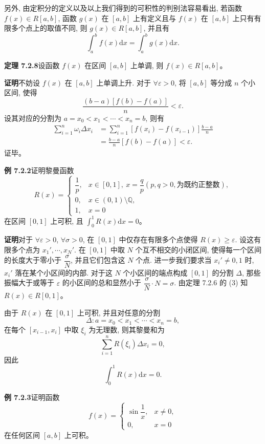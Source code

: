 \documentclass[UTF8,12pt,a4paper,fontset=fandol]{ctexart}
\begin{document}
另外, 由定积分的定义以及以上我们得到的可积性的判别法容易看出, 若函数 $f(x)\in R[a,b]$, 函数 $g(x)$ 在 $[a,b]$ 上有定义且与 $f(x)$ 在 $[a,b]$ 上只有有限多个点上的取值不同, 则 $g(x)\in R[a,b]$, 并且有
\[
  \int_a^b f(x)\mathrm dx=\int_a^b g(x)\mathrm dx.
\]

\noindent\textbf{定理 7.2.8}\quad 设函数 $f(x)$ 在区间 $[a,b]$ 上单调, 则 $f(x)\in R[a,b]$。

\noindent\textbf{证明}\quad 不妨设 $f(x)$ 在 $[a,b]$ 上单调上升. 对于 $\forall\varepsilon>0$, 将 $[a,b]$ 等分成 $n$ 个小区间, 使得
\[
  \frac{(b-a)[f(b)-f(a)]}{n}<\varepsilon.
\]
设其对应的分割为 $a=x_0<x_1<\cdots<x_n=b$, 则有
\[
\begin{aligned}
  \sum_{i=1}^n \omega_i\Delta x_i
  &=\sum_{i=1}^n [f(x_i)-f(x_{i-1})]\frac{b-a}{n}\\
  &=\frac{b-a}{n}[f(b)-f(a)]<\varepsilon.
\end{aligned}
\]
证毕。

\noindent\textbf{例 7.2.2}\quad 证明黎曼函数
\[
R(x)=
\begin{cases}
  \dfrac{1}{p}, & x\in[0,1],\ x=\dfrac{q}{p}(p,q>0,\text{为既约正整数}),\\
  0, & x\in(0,1)\setminus\mathbb Q,\\
  1, & x=0
\end{cases}
\]
在区间 $[0,1]$ 上可积, 且 $\int_0^1 R(x)\mathrm dx=0$。

\noindent\textbf{证明}\quad 对于 $\forall\varepsilon>0$, $\forall\sigma>0$, 在 $[0,1]$ 中仅存在有限多个点使得 $R(x)\geq\varepsilon$. 设这有限多个点为 $x_1',\cdots,x_N'$. 在 $[0,1]$ 中取 $N$ 个互不相交的小闭区间, 使得每一个区间的长度大于零小于 $\dfrac{\sigma}{N}$, 并且它们包含这 $N$ 个点. 进一步我们要求当 $x_i'\neq0,1$ 时, $x_i'$ 落在某个小区间的内部. 对于这 $N$ 个小区间的端点构成 $[0,1]$ 的分割 $\Delta$, 那些振幅大于或等于 $\varepsilon$ 的小区间的总和显然小于 $\dfrac{\sigma}{N}\cdot N=\sigma$. 由定理 7.2.6 的 (3) 知 $R(x)\in R[0,1]$。

由于 $R(x)$ 在 $[0,1]$ 上可积, 并且对任意的分割
\[
  \Delta:a=x_0<x_1<\cdots<x_n=b,
\]
在每个 $[x_{i-1},x_i]$ 中取 $\xi_i$ 为无理数, 则其黎曼和为
\[
  \sum_{i=1}^n R(\xi_i)\Delta x_i=0,
\]
因此
\[
  \int_0^1 R(x)\mathrm dx=0.
\]

\noindent\textbf{例 7.2.3}\quad 证明函数
\[
f(x)=
\begin{cases}
  \sin\dfrac{1}{x}, & x\neq0,\\
  0, & x=0
\end{cases}
\]
在任何区间 $[a,b]$ 上可积。
\end{document}
